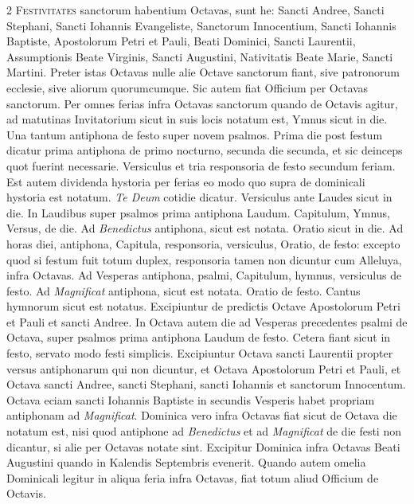 \begin{multicols*}{2}
{\color{Red} }
\lettrine[lines=2]{\zallmancaps \color{Blue} F}{estivitates} sanctorum habentium Octavas, sunt he: Sancti Andree, Sancti Stephani, Sancti Iohannis Evangeliste, Sanctorum Innocentium, Sancti Iohannis Baptiste, Apostolorum Petri et Pauli, Beati Dominici, Sancti Laurentii, Assumptionis Beate Virginis, Sancti Augustini, Nativitatis Beate Marie, Sancti Martini.
Preter istas Octavas nulle alie Octave sanctorum fiant, sive patronorum ecclesie, sive aliorum quorumcumque. Sic autem fiat Officium per Octavas sanctorum.
Per omnes ferias infra Octavas sanctorum quando de Octavis agitur, ad matutinas Invitatorium sicut in suis locis notatum est, Ymnus sicut in die. Una tantum antiphona de festo super novem psalmos. Prima die post festum dicatur prima antiphona de primo nocturno, secunda die secunda, et sic deinceps quot fuerint necessarie. Versiculus et tria responsoria de festo secundum feriam. Est autem dividenda hystoria per ferias eo modo quo supra de dominicali hystoria est notatum. \textit{Te Deum} cotidie dicatur. Versiculus ante Laudes sicut in die.
In Laudibus super psalmos prima antiphona Laudum. Capitulum, Ymnus, Versus, de die. Ad \textit{Benedictus} antiphona, sicut est notata. Oratio sicut in die. Ad horas diei, antiphona, Capitula, responsoria, versiculus, Oratio, de festo: excepto quod si festum fuit totum duplex, responsoria tamen non dicuntur cum Alleluya, infra Octavas. Ad Vesperas antiphona, psalmi, Capitulum, hymnus, versiculus de festo. Ad \textit{Magnificat} antiphona, sicut est notata. Oratio de festo. Cantus hymnorum sicut est notatus. Excipiuntur de predictis Octave Apostolorum Petri et Pauli et sancti Andree. In Octava autem die ad Vesperas precedentes psalmi de Octava, super psalmos prima antiphona Laudum de festo. Cetera fiant sicut in festo, servato modo festi simplicis. Excipiuntur Octava sancti Laurentii propter versus antiphonarum qui non dicuntur, et Octava Apostolorum Petri et Pauli, et Octava sancti Andree, sancti Stephani, sancti Iohannis et sanctorum Innocentum.
Octava eciam sancti Iohannis Baptiste in secundis Vesperis habet propriam antiphonam ad \textit{Magnificat}. Dominica vero infra Octavas fiat sicut de Octava die notatum est, nisi quod antiphone ad \textit{Benedictus} et ad \textit{Magnificat} de die festi non dicantur, si alie per Octavas notate sint. Excipitur Dominica infra Octavas Beati Augustini quando in Kalendis Septembris evenerit.
Quando autem omelia Dominicali legitur in aliqua feria infra Octavas, fiat totum aliud Officium de Octavis.


\end{multicols*}
